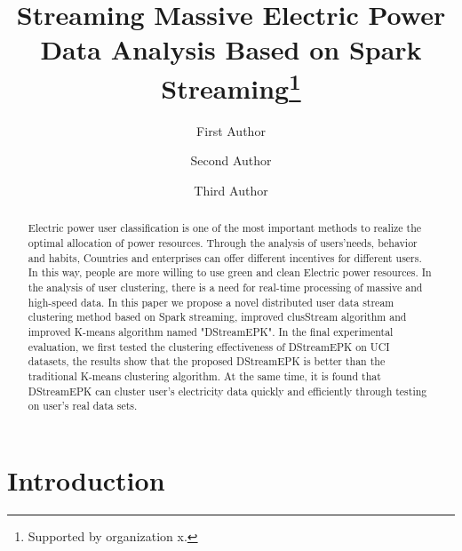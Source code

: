 \documentclass[runningheads]{llncs}
\begin{document}
%
\title{Streaming Massive Electric Power Data Analysis Based on Spark Streaming\thanks{Supported by organization x.}}
%
%
\author{First Author \and
Second Author \and
Third Author}
%
%
%
\maketitle              %
%
\begin{abstract}
Electric power user classification is one of the most important methods to realize the optimal allocation of power resources. Through the analysis of users'needs, behavior and habits, Countries and enterprises can offer different incentives for different users. In this way, people are more willing to use green and clean Electric power resources. In the analysis of user clustering, there is a need for real-time processing of massive and high-speed data. In this paper we propose a novel distributed user data stream clustering method based on Spark streaming, improved clusStream algorithm and improved K-means algorithm named "DStreamEPK". In the final experimental evaluation, we first tested the clustering effectiveness of DStreamEPK on UCI datasets, the results show that the proposed DStreamEPK is better than the traditional K-means clustering algorithm. At the same time, it is found that DStreamEPK can cluster user's electricity data quickly and efficiently through testing on user's real data sets.

\end{abstract}
%
%
%
\section{Introduction}
\end{document}
